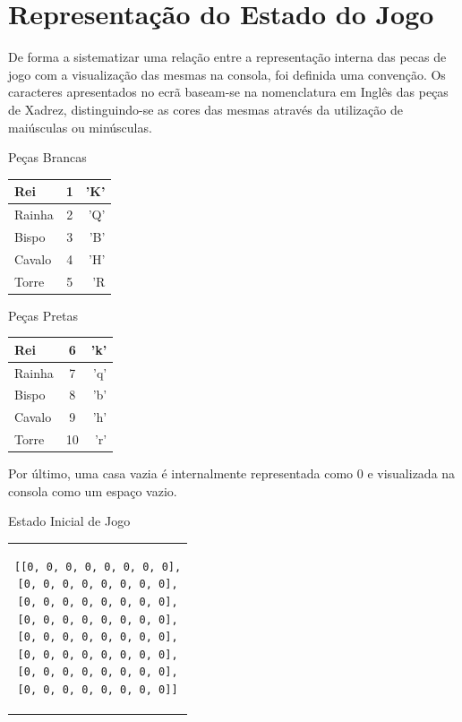 \documentclass[a4paper]{article}
\begin{document}
\section{Representação do Estado do Jogo}

De forma a sistematizar uma relação entre a representação interna das pecas de jogo com a visualização das mesmas na consola, foi definida uma convenção. Os caracteres apresentados no ecrã baseam-se na nomenclatura em Inglês das peças de Xadrez, distinguindo-se as cores das mesmas através da utilização de maiúsculas ou minúsculas.

\begin{small}

\large Peças Brancas
\begin{center}
  \begin{tabular}{ l | c | r }
    Rei & 1 & 'K' \\ \hline
    Rainha & 2 & 'Q' \\ \hline
    Bispo & 3 & 'B' \\ \hline
    Cavalo & 4 & 'H' \\ \hline
    Torre & 5 & 'R \\ 
  \end{tabular}
\end{center}

\endminipage\hfill
{}

\large Peças Pretas
\begin{center}
  \begin{tabular}{ l | c | r }
    Rei & 6 & 'k' \\ \hline
    Rainha & 7 & 'q' \\ \hline
    Bispo & 8 & 'b' \\ \hline
    Cavalo & 9 & 'h' \\ \hline
    Torre & 10 & 'r' \\ 
  \end{tabular}
\end{center}

\endminipage
\end{small} \newline\newline

Por último, uma casa vazia é internalmente representada como 0 e visualizada na consola como um espaço vazio. \newline

\large Estado Inicial de Jogo
\begin{center}
\begin{tabular}{c}
\begin{lstlisting}
[[0, 0, 0, 0, 0, 0, 0, 0],
[0, 0, 0, 0, 0, 0, 0, 0],
[0, 0, 0, 0, 0, 0, 0, 0],
[0, 0, 0, 0, 0, 0, 0, 0],
[0, 0, 0, 0, 0, 0, 0, 0],
[0, 0, 0, 0, 0, 0, 0, 0],
[0, 0, 0, 0, 0, 0, 0, 0],
[0, 0, 0, 0, 0, 0, 0, 0]]
\end{lstlisting}
\end{tabular}
\end{center}
\end{document}

